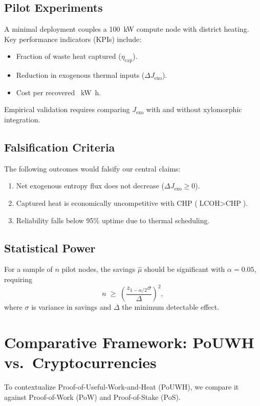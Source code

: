 \documentclass[12pt]{article}
\theoremstyle{plain}
\begin{document}
{{{{{{{{{{{{{{{{\subsection{Pilot Experiments}
A minimal deployment couples a \SI{100}{\kilo\watt} compute node with district heating. Key performance indicators (KPIs) include:
\begin{itemize}
    \item Fraction of waste heat captured ($\eta_{\text{cap}}$).
    \item Reduction in exogenous thermal inputs ($\Delta J_{\text{exo}}$).
    \item Cost per recovered \SI{}{\kilo\watt\hour}.
\end{itemize}
Empirical validation requires comparing $J_{\text{exo}}$ with and without xylomorphic integration.

\subsection{Falsification Criteria}
The following outcomes would falsify our central claims:
\begin{enumerate}
    \item Net exogenous entropy flux does not decrease ($\Delta J_{\text{exo}} \geq 0$).
    \item Captured heat is economically uncompetitive with CHP ($\text{LCOH} > \text{CHP}$).
    \item Reliability falls below 95\% uptime due to thermal scheduling.
\end{enumerate}

\subsection{Statistical Power}
For a sample of $n$ pilot nodes, the savings $\hat{\mu}$ should be significant with $\alpha=0.05$, requiring
\[
n \;\geq\; \left( \frac{z_{1-\alpha/2}\sigma}{\Delta} \right)^2,
\]
where $\sigma$ is variance in savings and $\Delta$ the minimum detectable effect.

\section{Comparative Framework: PoUWH vs.\ Cryptocurrencies}
\label{sec:comparative-framework}

To contextualize Proof-of-Useful-Work-and-Heat (PoUWH), we compare it against Proof-of-Work (PoW) and Proof-of-Stake (PoS).

}}}}}}}}}}}}}}}}
\end{document}
